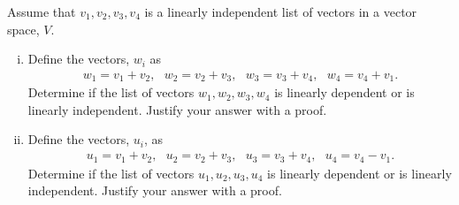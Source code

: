 \begin{question}
	\normalfont
	
		
	\noindent Assume that \hspace{.1cm} $v_1, v_2, v_3, v_4$ \hspace{.1cm} is a linearly independent list of vectors in a vector space, $V$.
	
	\begin{enumerate}[(i)]
		\item Define the vectors, $w_i$ as
		\begin{align*}
			w_1 = v_1 + v_2,\ \ \ 
			w_2 = v_2 + v_3,\ \ \ 
			w_3 = v_3 + v_4,\ \ \
			w_4 = v_4 + v_1.
		\end{align*}
		Determine if the list of vectors \hspace{.1cm} $w_1, w_2, w_3, w_4$ \hspace{.1cm} is linearly dependent or is linearly independent. Justify your answer with a proof.		
		\item Define the vectors, $u_i$, as
		\begin{align*}
			u_1 = v_1 + v_2,\ \ \ 
			u_2 = v_2 + v_3,\ \ \ 
			u_3 = v_3 + v_4,\ \ \
			u_4 = v_4 - v_1.
		\end{align*}
		Determine if the list of vectors \hspace{.1cm}  $ u_1, u_2, u_3, u_4 $  \hspace{.1cm} is linearly dependent or is linearly independent.  Justify your answer with a proof.	
	\end{enumerate}
\end{question}